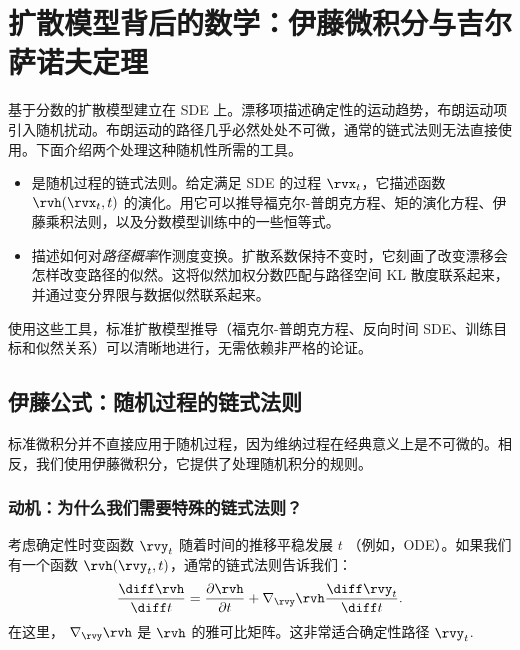 \chapter{扩散模型背后的数学：伊藤微积分与吉尔萨诺夫定理}\label{app:Ito}


基于分数的扩散模型建立在 SDE 上。漂移项描述确定性的运动趋势，布朗运动项引入随机扰动。布朗运动的路径几乎必然处处不可微，通常的链式法则无法直接使用。下面介绍两个处理这种随机性所需的工具。
\begin{itemize}
\item {}是随机过程的链式法则。给定满足 SDE 的过程 $\rvx_t$，它描述函数 $\rvh(\rvx_t,t)$ 的演化。用它可以推导福克尔-普朗克方程、矩的演化方程、伊藤乘积法则，以及分数模型训练中的一些恒等式。
\item {}描述如何对\emph{路径概率}作测度变换。扩散系数保持不变时，它刻画了改变漂移会怎样改变路径的似然。这将似然加权分数匹配与路径空间 KL 散度联系起来，并通过变分界限与数据似然联系起来。
\end{itemize}

使用这些工具，标准扩散模型推导（福克尔-普朗克方程、反向时间 SDE、训练目标和似然关系）可以清晰地进行，无需依赖非严格的论证。



\section{伊藤公式：随机过程的链式法则}
标准微积分并不直接应用于随机过程，因为维纳过程在经典意义上是不可微的。相反，我们使用伊藤微积分，它提供了处理随机积分的规则。

\subsection{动机：为什么我们需要特殊的链式法则？}
考虑确定性时变函数 $\rvy_t$ 随着时间的推移平稳发展 $t$ （例如，ODE）。如果我们有一个函数 $\rvh(\rvy_t, t)$，通常的链式法则告诉我们：
\[
\frac{\diff \rvh}{\diff t} = \frac{\partial \rvh}{\partial t}  + \nabla_{\rvy}\rvh  \frac{\diff \rvy_t}{\diff t} .
\]
在这里， $\nabla_{\rvy}\rvh$ 是 $\rvh$ 的雅可比矩阵。这非常适合确定性路径 $\rvy_t$.

